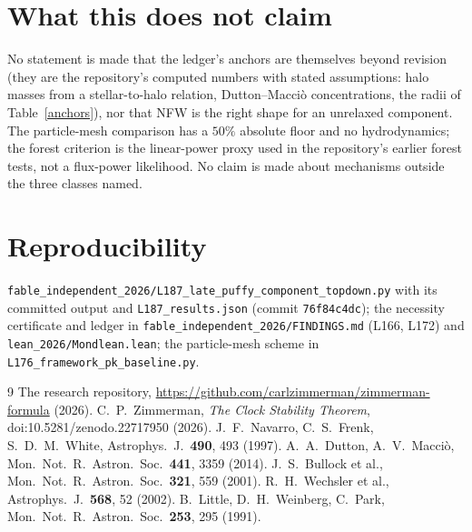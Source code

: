 \documentclass[11pt,letterpaper]{article}
\begin{document}
\section{What this does not claim}
No statement is made that the ledger's anchors are themselves beyond revision (they are the repository's computed numbers with stated assumptions: halo masses from a stellar-to-halo relation, Dutton--Macciò concentrations, the radii of Table~\ref{anchors}), nor that NFW is the right shape for an unrelaxed component. The particle-mesh comparison has a $50\%$ absolute floor and no hydrodynamics; the forest criterion is the linear-power proxy used in the repository's earlier forest tests, not a flux-power likelihood. No claim is made about mechanisms outside the three classes named.

\section{Reproducibility}
\texttt{fable\_independent\_2026/L187\_late\_puffy\_component\_topdown.py} with its committed output and \texttt{L187\_results.json} (commit \texttt{76f84c4dc}); the necessity certificate and ledger in \texttt{fable\_independent\_2026/FINDINGS.md} (L166, L172) and \texttt{lean\_2026/Mondlean.lean}; the particle-mesh scheme in \texttt{L176\_framework\_pk\_baseline.py}.

\begin{thebibliography}{9}
 The research repository, \url{https://github.com/carlzimmerman/zimmerman-formula} (2026).
 C.~P.~Zimmerman, \emph{The Clock Stability Theorem}, doi:10.5281/zenodo.22717950 (2026).
 J.~F.~Navarro, C.~S.~Frenk, S.~D.~M.~White, Astrophys.\ J.\ \textbf{490}, 493 (1997).
 A.~A.~Dutton, A.~V.~Macci\`o, Mon.\ Not.\ R.\ Astron.\ Soc.\ \textbf{441}, 3359 (2014).
 J.~S.~Bullock et al., Mon.\ Not.\ R.\ Astron.\ Soc.\ \textbf{321}, 559 (2001).
 R.~H.~Wechsler et al., Astrophys.\ J.\ \textbf{568}, 52 (2002).
 B.~Little, D.~H.~Weinberg, C.~Park, Mon.\ Not.\ R.\ Astron.\ Soc.\ \textbf{253}, 295 (1991).
\end{thebibliography}
\end{document}
